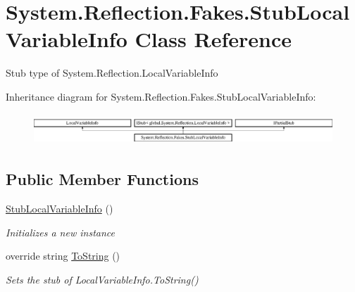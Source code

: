 \hypertarget{class_system_1_1_reflection_1_1_fakes_1_1_stub_local_variable_info}{\section{System.\-Reflection.\-Fakes.\-Stub\-Local\-Variable\-Info Class Reference}
\label{class_system_1_1_reflection_1_1_fakes_1_1_stub_local_variable_info}
}


Stub type of System.\-Reflection.\-Local\-Variable\-Info 


Inheritance diagram for System.\-Reflection.\-Fakes.\-Stub\-Local\-Variable\-Info\-:\begin{figure}[H]
\begin{center}
\leavevmode
\includegraphics[height=1.188960cm]{class_system_1_1_reflection_1_1_fakes_1_1_stub_local_variable_info}
\end{center}
\end{figure}
\subsection*{Public Member Functions}
\begin{DoxyCompactItemize}
\item 
\hyperlink{class_system_1_1_reflection_1_1_fakes_1_1_stub_local_variable_info_a7e1ab1db3ce63f85a11f44add281c7d9}{Stub\-Local\-Variable\-Info} ()
\begin{DoxyCompactList}\small\item\em Initializes a new instance\end{DoxyCompactList}\item 
override string \hyperlink{class_system_1_1_reflection_1_1_fakes_1_1_stub_local_variable_info_a453c9077b83870570dab95075db41aa9}{To\-String} ()
\begin{DoxyCompactList}\small\item\em Sets the stub of Local\-Variable\-Info.\-To\-String()\end{DoxyCompactList}\end{DoxyCompactItemize}
